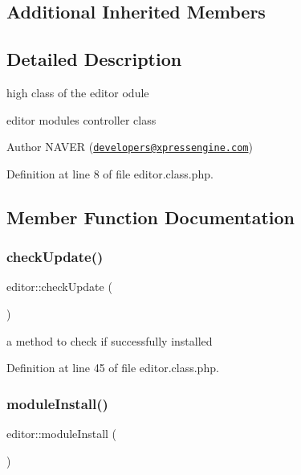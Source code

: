 \subsection*{Additional Inherited Members}


\subsection{Detailed Description}
high class of the editor odule 

editor module\textquotesingle{}s controller class

\begin{DoxyAuthor}{Author}
N\+A\+V\+ER (\href{mailto:developers@xpressengine.com}{\tt developers@xpressengine.\+com}) 
\end{DoxyAuthor}


Definition at line 8 of file editor.\+class.\+php.



\subsection{Member Function Documentation}
\hypertarget{classeditor_a1247f9114d6c06b321de3b360920364b}{}\label{classeditor_a1247f9114d6c06b321de3b360920364b} 
\subsubsection{\texorpdfstring{check\+Update()}{checkUpdate()}}
{\footnotesize\ttfamily editor\+::check\+Update (\begin{DoxyParamCaption}{ }\end{DoxyParamCaption})}



a method to check if successfully installed 



Definition at line 45 of file editor.\+class.\+php.

\hypertarget{classeditor_a4429a1458f38d5005fb611f552ae00e7}{}\label{classeditor_a4429a1458f38d5005fb611f552ae00e7} 
\subsubsection{\texorpdfstring{module\+Install()}{moduleInstall()}}
{\footnotesize\ttfamily editor\+::module\+Install (\begin{DoxyParamCaption}{ }\end{DoxyParamCaption})}



